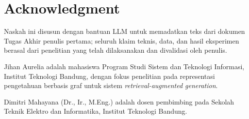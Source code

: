 \documentclass{ieeeaccess}
\newcounter{biography}
\begin{document}
\section*{Acknowledgment}
Naskah ini disusun dengan bantuan LLM untuk memadatkan teks dari dokumen Tugas Akhir penulis pertama; seluruh klaim teknis, data, dan hasil eksperimen berasal dari penelitian yang telah dilaksanakan dan divalidasi oleh penulis.




\begin{biographynophoto}{Jihan Aurelia}
adalah mahasiswa Program Studi Sistem dan Teknologi Informasi, Institut Teknologi Bandung, dengan fokus penelitian pada representasi pengetahuan berbasis graf untuk sistem \textit{retrieval-augmented generation}.
\end{biographynophoto}

\begin{biographynophoto}{Dimitri Mahayana}
(Dr., Ir., M.Eng.) adalah dosen pembimbing pada Sekolah Teknik Elektro dan Informatika, Institut Teknologi Bandung.\EOD
\end{biographynophoto}
\end{document}
